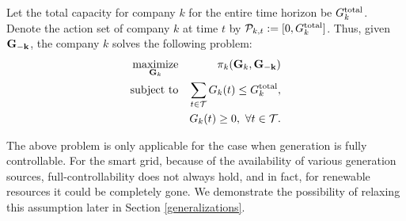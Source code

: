 
Let the total capacity for company $k$ for the entire time horizon be $G^{{\rm total}}_k$. Denote the action set of company $k$ at time $t$ by ${\cal P}_{k,t}:=[0,G^{{\rm total}}_k]$. Thus, given ${\bf{G_{-k}}}$,  the company $k$ solves the following problem:
\begin{eqnarray}
\underset{\mathbf{G}_k }{\hbox{maximize}} && \pi_k({\bf{G}}_k,{\bf{G_{-k}}})
\nonumber \\
\hbox{subject to} && \sum_{t\in {\cal T}}G_k(t) \leq G^{{\rm total}}_k, \\ \label{prob3}
&& G_k(t)\geq0, \ \forall t\in{\cal T}. \nonumber\end{eqnarray}

{\color{black}The above problem is only applicable for the case when generation is fully controllable. For the smart grid, because of the availability of various generation sources, full-controllability does not always hold, and in fact, for renewable resources it could be completely gone. We demonstrate the possibility of relaxing this assumption later in Section \ref{generalizations}.}

